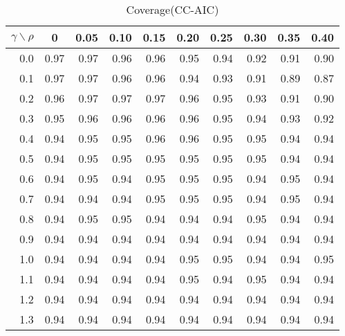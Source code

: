 \documentclass[12pt]{article}
\begin{document}
%
\begin{table}[!tbp]
\caption{Coverage(CC-AIC)}
 \begin{center}
 \begin{tabular}{r|rrrrrrrrr}\hline\hline
\multicolumn{1}{c|}{$\gamma\backslash\rho$}&\multicolumn{1}{c}{0}&\multicolumn{1}{c}{0.05}&\multicolumn{1}{c}{0.10}&\multicolumn{1}{c}{0.15}&\multicolumn{1}{c}{0.20}&\multicolumn{1}{c}{0.25}&\multicolumn{1}{c}{0.30}&\multicolumn{1}{c}{0.35}&\multicolumn{1}{c}{0.40}\tabularnewline
\hline

0.0&0.97&0.97&0.96&0.96&0.95&0.94&0.92&0.91&0.90\tabularnewline
0.1&0.97&0.97&0.96&0.96&0.94&0.93&0.91&0.89&0.87\tabularnewline
0.2&0.96&0.97&0.97&0.97&0.96&0.95&0.93&0.91&0.90\tabularnewline
0.3&0.95&0.96&0.96&0.96&0.96&0.95&0.94&0.93&0.92\tabularnewline
0.4&0.94&0.95&0.95&0.96&0.96&0.95&0.95&0.94&0.94\tabularnewline
0.5&0.94&0.95&0.95&0.95&0.95&0.95&0.95&0.94&0.94\tabularnewline
0.6&0.94&0.95&0.94&0.95&0.95&0.95&0.94&0.95&0.94\tabularnewline
0.7&0.94&0.94&0.94&0.95&0.95&0.95&0.94&0.95&0.94\tabularnewline
0.8&0.94&0.95&0.95&0.94&0.94&0.94&0.95&0.94&0.94\tabularnewline
0.9&0.94&0.94&0.94&0.94&0.94&0.94&0.94&0.94&0.94\tabularnewline
1.0&0.94&0.94&0.94&0.94&0.95&0.95&0.94&0.94&0.95\tabularnewline
1.1&0.94&0.94&0.94&0.94&0.95&0.94&0.95&0.94&0.94\tabularnewline
1.2&0.94&0.94&0.94&0.94&0.94&0.94&0.94&0.94&0.94\tabularnewline
1.3&0.94&0.94&0.94&0.94&0.94&0.94&0.94&0.94&0.94\tabularnewline
\hline
\end{tabular}

\end{center}

\end{table}
\end{document}
